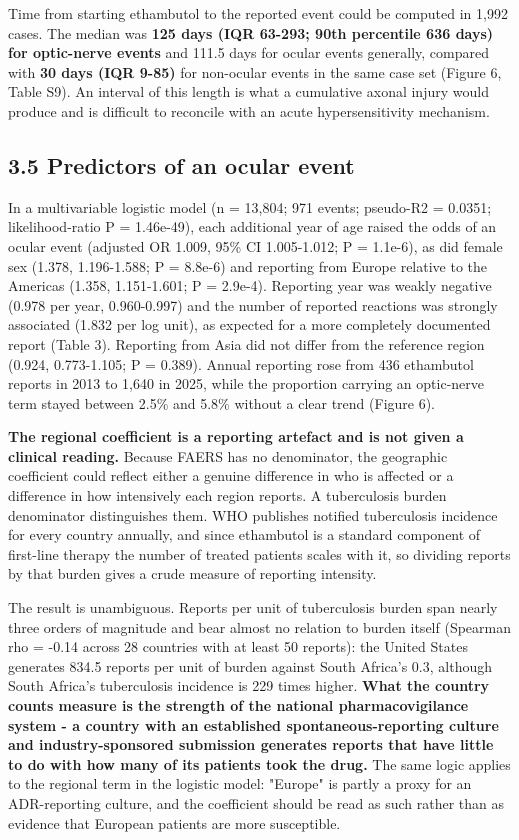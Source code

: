 \documentclass[utf8]{FrontiersinVancouver}
\begin{document}
Time from starting ethambutol to the reported event could be computed in 1,992 cases. The median was \textbf{125 days (IQR 63-293; 90th percentile 636 days) for optic-nerve events} and 111.5 days for ocular events generally, compared with \textbf{30 days (IQR 9-85)} for non-ocular events in the same case set (Figure 6, Table S9). An interval of this length is what a cumulative axonal injury would produce and is difficult to reconcile with an acute hypersensitivity mechanism.

\subsection{3.5 Predictors of an ocular event}

In a multivariable logistic model (n = 13,804; 971 events; pseudo-R2 = 0.0351; likelihood-ratio P = 1.46e-49), each additional year of age raised the odds of an ocular event (adjusted OR 1.009, 95\% CI 1.005-1.012; P = 1.1e-6), as did female sex (1.378, 1.196-1.588; P = 8.8e-6) and reporting from Europe relative to the Americas (1.358, 1.151-1.601; P = 2.9e-4). Reporting year was weakly negative (0.978 per year, 0.960-0.997) and the number of reported reactions was strongly associated (1.832 per log unit), as expected for a more completely documented report (Table 3). Reporting from Asia did not differ from the reference region (0.924, 0.773-1.105; P = 0.389). Annual reporting rose from 436 ethambutol reports in 2013 to 1,640 in 2025, while the proportion carrying an optic-nerve term stayed between 2.5\% and 5.8\% without a clear trend (Figure 6).

\textbf{The regional coefficient is a reporting artefact and is not given a clinical reading.} Because FAERS has no denominator, the geographic coefficient could reflect either a genuine difference in who is affected or a difference in how intensively each region reports. A tuberculosis burden denominator distinguishes them. WHO publishes notified tuberculosis incidence for every country annually, and since ethambutol is a standard component of first-line therapy the number of treated patients scales with it, so dividing reports by that burden gives a crude measure of reporting intensity.

The result is unambiguous. Reports per unit of tuberculosis burden span nearly three orders of magnitude and bear almost no relation to burden itself (Spearman rho = -0.14 across 28 countries with at least 50 reports): the United States generates 834.5 reports per unit of burden against South Africa's 0.3, although South Africa's tuberculosis incidence is 229 times higher. \textbf{What the country counts measure is the strength of the national pharmacovigilance system - a country with an established spontaneous-reporting culture and industry-sponsored submission generates reports that have little to do with how many of its patients took the drug.} The same logic applies to the regional term in the logistic model: "Europe" is partly a proxy for an ADR-reporting culture, and the coefficient should be read as such rather than as evidence that European patients are more susceptible.
\end{document}

